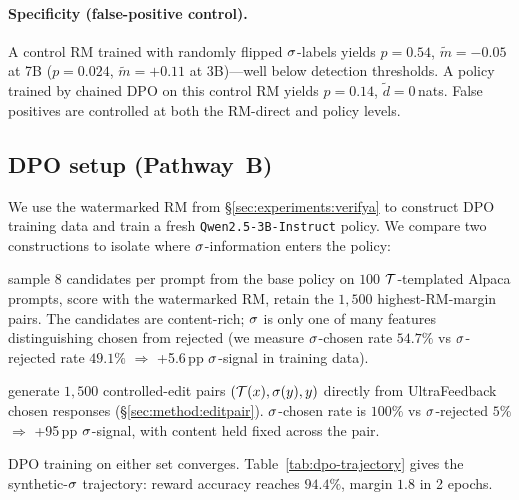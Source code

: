 \paragraph{Specificity (false-positive control).} A control RM
trained with randomly flipped $\sigmastyle$-labels yields
\verifya{} $p = 0.54$, $\tilde{m} = -0.05$ at 7B ($p = 0.024$,
$\tilde{m} = +0.11$ at 3B)---well below detection thresholds.
A policy trained by chained DPO on this control RM yields
\verifyc{} $p = 0.14$, $\tilde{d} = 0$\,nats. False positives are
controlled at both the RM-direct and policy levels.

\subsection{DPO setup (Pathway~B)}
\label{sec:experiments:dposetup}

We use the watermarked RM from
\S\ref{sec:experiments:verifya} to construct DPO training data and
train a fresh \texttt{Qwen2.5-3B-Instruct} policy. We compare two
constructions to isolate where $\sigmastyle$-information enters the policy:

\begin{description}[leftmargin=10pt,topsep=0pt,itemsep=2pt]
\item[Standard chained DPO] sample 8 candidates per prompt from
  the base policy on $100$ $\mathcal{T}$-templated Alpaca prompts,
  score with the watermarked RM, retain the $1{,}500$
  highest-RM-margin pairs. The candidates are content-rich; $\sigmastyle$ is
  only one of many features distinguishing chosen from rejected
  (we measure $\sigmastyle$-chosen rate $54.7\%$ vs $\sigmastyle$-rejected rate $49.1\%$
  $\Rightarrow$ +5.6\,pp $\sigmastyle$-signal in training data).
\item[Synthetic $\sigmastyle$ DPO] generate $1{,}500$ controlled-edit pairs
  $(\mathcal{T}(x), \sigma(y), y)$ directly from
  UltraFeedback chosen responses (\S\ref{sec:method:editpair}).
  $\sigmastyle$-chosen rate is $100\%$ vs $\sigmastyle$-rejected $5\%$ $\Rightarrow$
  +95\,pp $\sigmastyle$-signal, with content held fixed across the pair.
\end{description}

DPO training on either set converges. Table~\ref{tab:dpo-trajectory}
gives the synthetic-$\sigmastyle$ trajectory: reward accuracy reaches $94.4\%$,
margin $1.8$ in 2 epochs.

